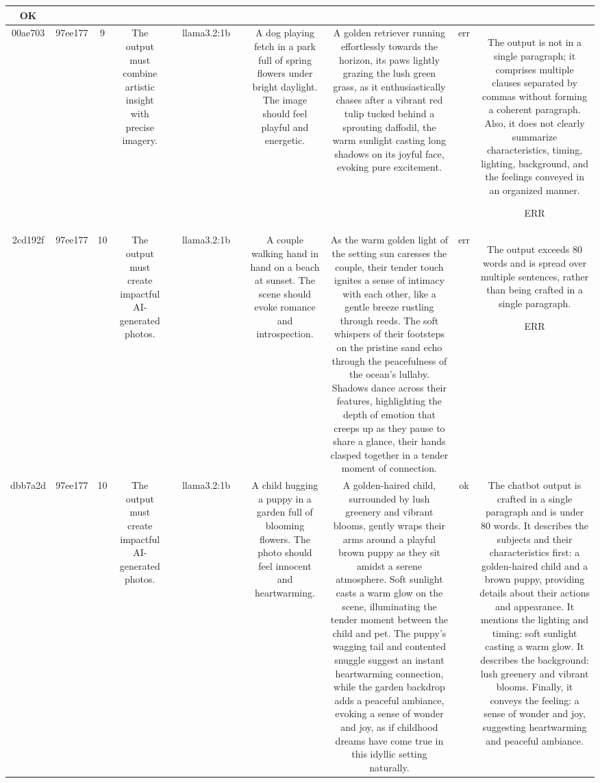 \begin{table}[h!]
\begin{tabular}{|c|c|c|c|c|c|c|c|c|c|c|}
OK\\
\hline
00ae703 & 97ee177 & 9 & The output must combine artistic insight with precise imagery. &  & llama3.2:1b &  & A dog playing fetch in a park full of spring flowers under bright daylight. The image should feel playful and energetic. & A golden retriever running effortlessly towards the horizon, its paws lightly grazing the lush green grass, as it enthusiastically chases after a vibrant red tulip tucked behind a sprouting daffodil, the warm sunlight casting long shadows on its joyful face, evoking pure excitement. & err & The output is not in a single paragraph; it comprises multiple clauses separated by commas without forming a coherent paragraph. Also, it does not clearly summarize characteristics, timing, lighting, background, and the feelings conveyed in an organized manner.

ERR\\
\hline
2cd192f & 97ee177 & 10 & The output must create impactful AI-generated photos. &  & llama3.2:1b &  & A couple walking hand in hand on a beach at sunset. The scene should evoke romance and introspection. & As the warm golden light of the setting sun caresses the couple, their tender touch ignites a sense of intimacy with each other, like a gentle breeze rustling through reeds. The soft whispers of their footsteps on the pristine sand echo through the peacefulness of the ocean's lullaby. Shadows dance across their features, highlighting the depth of emotion that creeps up as they pause to share a glance, their hands clasped together in a tender moment of connection. & err & The output exceeds 80 words and is spread over multiple sentences, rather than being crafted in a single paragraph. 

ERR\\
\hline
dbb7a2d & 97ee177 & 10 & The output must create impactful AI-generated photos. &  & llama3.2:1b &  & A child hugging a puppy in a garden full of blooming flowers. The photo should feel innocent and heartwarming. & A golden-haired child, surrounded by lush greenery and vibrant blooms, gently wraps their arms around a playful brown puppy as they sit amidst a serene atmosphere. Soft sunlight casts a warm glow on the scene, illuminating the tender moment between the child and pet. The puppy's wagging tail and contented snuggle suggest an instant heartwarming connection, while the garden backdrop adds a peaceful ambiance, evoking a sense of wonder and joy, as if childhood dreams have come true in this idyllic setting naturally. & ok & The chatbot output is crafted in a single paragraph and is under 80 words. It describes the subjects and their characteristics first: a golden-haired child and a brown puppy, providing details about their actions and appearance. It mentions the lighting and timing: soft sunlight casting a warm glow. It describes the background: lush greenery and vibrant blooms. Finally, it conveys the feeling: a sense of wonder and joy, suggesting heartwarming and peaceful ambiance. 


\end{tabular}
\end{table}
